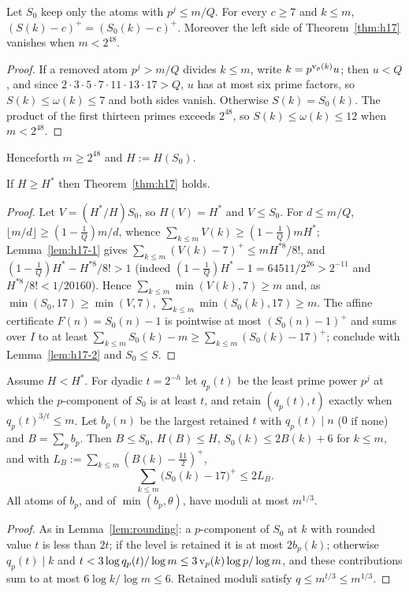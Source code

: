 \begin{lemma}\label{lem:h17-2}
Let $S_0$ keep only the atoms with $p^j\le m/Q$. For every $c\ge7$ and $k\le m$, $(S(k)-c)^+=(S_0(k)-c)^+$. Moreover the left
side of Theorem~\ref{thm:h17} vanishes when $m<2^{48}$.
\end{lemma}
\begin{proof}
If a removed atom $p^j>m/Q$ divides $k\le m$, write $k=p^{\operatorname{v}_p(k)}u$; then $u<Q$, and since $2\cdot3\cdot5\cdot7\cdot11\cdot13\cdot17>Q$,
$u$ has at most six prime factors, so $S(k)\le\omega(k)\le7$ and both sides vanish. Otherwise $S(k)=S_0(k)$. The product of the
first thirteen primes exceeds $2^{48}$, so $S(k)\le\omega(k)\le12$ when $m<2^{48}$.
\end{proof}

Henceforth $m\ge2^{48}$ and $H:=H(S_0)$.

\begin{lemma}\label{lem:h17-3}
If $H\ge H^*$ then Theorem~\ref{thm:h17} holds.
\end{lemma}
\begin{proof}
Let $V=(H^*/H)S_0$, so $H(V)=H^*$ and $V\le S_0$. For $d\le m/Q$, $\lfloor m/d\rfloor\ge(1-\tfrac1Q)m/d$, whence
$\sum_{k\le m}V(k)\ge(1-\tfrac1Q)mH^*$; Lemma~\ref{lem:h17-1} gives $\sum_{k\le m}(V(k)-7)^+\le mH^{*8}/8!$, and
$(1-\tfrac1Q)H^*-H^{*8}/8!>1$ (indeed $(1-\tfrac1Q)H^*-1=64511/2^{26}>2^{-11}$ and $H^{*8}/8!<1/20160$). Hence
$\sum_{k\le m}\min(V(k),7)\ge m$ and, as $\min(S_0,17)\ge\min(V,7)$, $\sum_{k\le m}\min(S_0(k),17)\ge m$. The affine
certificate $F(n)=S_0(n)-1$ is pointwise at most $(S_0(n)-1)^+$ and sums over $I$ to at least $\sum_{k\le m}S_0(k)-m\ge
\sum_{k\le m}(S_0(k)-17)^+$; conclude with Lemma~\ref{lem:h17-2} and $S_0\le S$.
\end{proof}

\begin{lemma}\label{lem:h17-4}
Assume $H<H^*$. For dyadic $t=2^{-h}$ let $q_p(t)$ be the least prime power $p^j$ at which the $p$-component of $S_0$ is at
least $t$, and retain $(q_p(t),t)$ exactly when $q_p(t)^{3/t}\le m$. Let $b_p(n)$ be the largest retained $t$ with $q_p(t)\mid n$
($0$ if none) and $B=\sum_pb_p$. Then $B\le S_0$, $H(B)\le H$, $S_0(k)\le2B(k)+6$ for $k\le m$, and with
$L_B:=\sum_{k\le m}(B(k)-\tfrac{11}2)^+$,
\[
\sum_{k\le m}\bigl(S_0(k)-17\bigr)^+\le2L_B .
\]
All atoms of $b_p$, and of $\min(b_p,\theta)$, have moduli at most $m^{1/3}$.
\end{lemma}
\begin{proof}
As in Lemma~\ref{lem:rounding}: a $p$-component of $S_0$ at $k$ with rounded value $t$ is less than $2t$; if the level is
retained it is at most $2b_p(k)$; otherwise $q_p(t)\mid k$ and $t<3\log q_p(t)/\log m\le3\operatorname{v}_p(k)\log p/\log m$, and these
contributions sum to at most $6\log k/\log m\le6$. Retained moduli satisfy $q\le m^{t/3}\le m^{1/3}$.
\end{proof}

